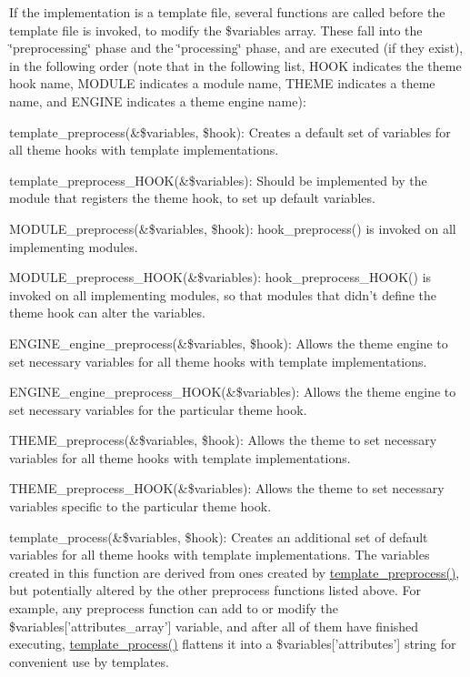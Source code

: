 If the implementation is a template file, several functions are called before the template file is invoked, to modify the \$variables array. These fall into the \char`\"{}preprocessing\char`\"{} phase and the \char`\"{}processing\char`\"{} phase, and are executed (if they exist), in the following order (note that in the following list, HOOK indicates the theme hook name, MODULE indicates a module name, THEME indicates a theme name, and ENGINE indicates a theme engine name):
\begin{DoxyItemize}
\item template\_\-preprocess(\&\$variables, \$hook): Creates a default set of variables for all theme hooks with template implementations.
\item template\_\-preprocess\_\-HOOK(\&\$variables): Should be implemented by the module that registers the theme hook, to set up default variables.
\item MODULE\_\-preprocess(\&\$variables, \$hook): hook\_\-preprocess() is invoked on all implementing modules.
\item MODULE\_\-preprocess\_\-HOOK(\&\$variables): hook\_\-preprocess\_\-HOOK() is invoked on all implementing modules, so that modules that didn't define the theme hook can alter the variables.
\item ENGINE\_\-engine\_\-preprocess(\&\$variables, \$hook): Allows the theme engine to set necessary variables for all theme hooks with template implementations.
\item ENGINE\_\-engine\_\-preprocess\_\-HOOK(\&\$variables): Allows the theme engine to set necessary variables for the particular theme hook.
\item THEME\_\-preprocess(\&\$variables, \$hook): Allows the theme to set necessary variables for all theme hooks with template implementations.
\item THEME\_\-preprocess\_\-HOOK(\&\$variables): Allows the theme to set necessary variables specific to the particular theme hook.
\item template\_\-process(\&\$variables, \$hook): Creates an additional set of default variables for all theme hooks with template implementations. The variables created in this function are derived from ones created by \hyperlink{includes_2theme_8inc_a3eeb7bcdba7ef4859f99586da264d347}{template\_\-preprocess()}, but potentially altered by the other preprocess functions listed above. For example, any preprocess function can add to or modify the \$variables\mbox{[}'attributes\_\-array'\mbox{]} variable, and after all of them have finished executing, \hyperlink{includes_2theme_8inc_a9b4d56c55dab2c59b7af6f71d6b1a940}{template\_\-process()} flattens it into a \$variables\mbox{[}'attributes'\mbox{]} string for convenient use by templates.

\end{DoxyItemize}
